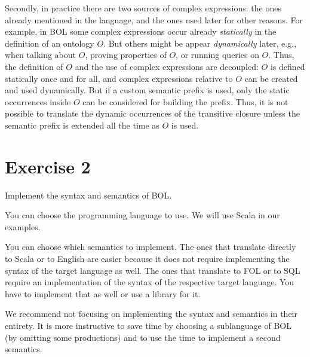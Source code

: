 Secondly, in practice there are two sources of complex expressions: the ones already mentioned in the language, and the ones used later for other reasons.
For example, in BOL some complex expressions occur already \emph{statically} in the definition of an ontology $O$.
But others might be appear \emph{dynamically} later, e.g., when talking about $O$, proving properties of $O$, or running queries on $O$.
Thus, the definition of $O$ and the use of complex expressions are decoupled: $O$ is defined statically once and for all, and complex expressions relative to $O$ can be created and used dynamically.
But if a custom semantic prefix is used, only the static occurrences inside $O$ can be considered for building the prefix.
Thus, it is not possible to translate the dynamic occurrences of the transitive closure unless the semantic prefix is extended all the time as $O$ is used.

\section{Exercise 2}

Implement the syntax and semantics of BOL.

You can choose the programming language to use. We will use Scala in our examples.

You can choose which semantics to implement.
The ones that translate directly to Scala or to English are easier because it does not require implementing the syntax of the target language as well.
The ones that translate to FOL or to SQL require an implementation of the syntax of the respective target language.
You have to implement that as well or use a library for it.

We recommend not focusing on implementing the syntax and semantics in their entirety.
It is more instructive to save time by choosing a sublanguage of BOL (by omitting some productions) and to use the time to implement a second semantics.